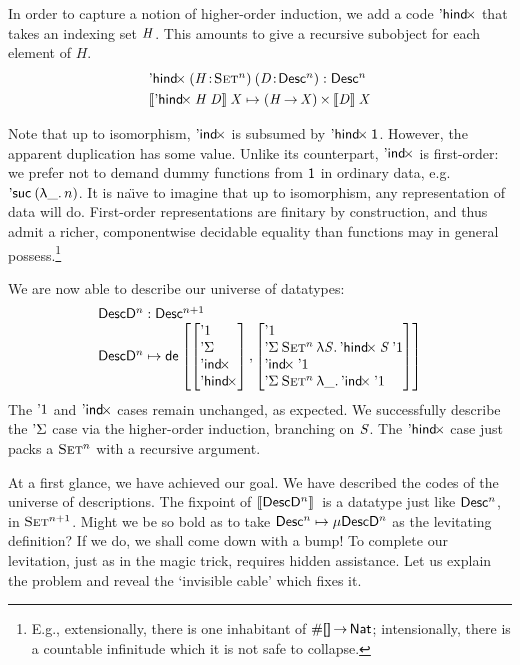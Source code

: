 In order to capture a notion of higher-order induction, we add a code
$\SYMBDHindx$ that takes an indexing set $\V{H}$. This amounts to give
a recursive subobject for each element of $H$.
%
\[\stk{
    \DHindx{(\Bhab{\M{H}}{\Set^n})}{(\Bhab{\M{D}}{\Desc^n})} : \Desc^n
    \smallskip \\
    \descop{\DHindx{\V{H}}{\V{D}}}{\V{X}}     
        \mapsto 
            \TIMES{(\V{H} \To \V{X})}{\descop{\V{D}}{\V{X}}} \\
}\]


Note that up to isomorphism, $\SYMBDIndx$ is subsumed by
$\DHindx{\Unit}{\!}$. However, the apparent duplication has some
value.  Unlike its counterpart, $\SYMBDIndx$ is first-order: we prefer
not to demand dummy functions from \(\Unit\) in ordinary data,
e.g. \(\NatSuc{(\LAM{\_}n)}\). It is na{\"\i}ve to imagine that up to
isomorphism, any representation of data will do.  First-order
representations are finitary by construction, and thus admit a richer,
componentwise decidable equality than functions may in
general possess.\footnote{E.g., extensionally, there is one inhabitant of
\(\EnumT{\void}\To\Nat\); intensionally, there is a countable infinitude
which it is not safe to collapse.}

We are now able to describe our universe of datatypes:
%
\[\stk{
\DescD^n : \Desc^{n+1} \\
\DescD^n \mapsto\tada
{\stkm{ \DUnit\\ \SYMBDSigma\\ \SYMBDIndx\\ \SYMBDHindx}}
{\stkm{
\DUnit                                            \\
                                   \DSigma{\Set^n}{\LAM{\V{S}} \DHindx{\V{S}}{\DUnit}}   \\
                                   \DIndx{\DUnit}                                    \\
                                   \DSigma{\Set^n}{\LAM{\_} \DIndx{\DUnit}}
}}
}\]
%
The $\DUnit$ and $\SYMBDIndx$ cases remain unchanged, as expected. We
successfully describe the $\SYMBDSigma$ case via
the higher-order induction, branching on $\V{S}$. The $\SYMBDHindx$ case
just packs a $\Set^n$ with a recursive argument.

At a first glance, we have achieved our goal. We have described the
codes of the universe of descriptions. The fixpoint of \(\descop{\DescD^n}\)
is a datatype just like $\Desc^n$, in $\Set^{n+1}$. Might we be
so bold as to take \(\Desc^n \mapsto \Mu{\DescD^n}\) as the levitating
definition? If we do, we shall come down with a bump! 
To complete our levitation, just as in the magic trick, requires
hidden assistance. Let us explain the problem and reveal the `invisible
cable' which fixes it.


